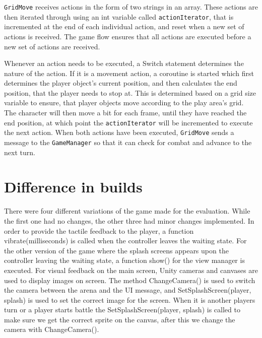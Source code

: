 \texttt{GridMove} receives actions in the form of two strings in an array. These actions are then iterated through using an int variable called \texttt{actionIterator}, that is incremented at the end of each individual action, and reset when a new set of actions is received. The game flow ensures that all actions are executed before a new set of actions are received. 

Whenever an action needs to be executed, a Switch statement determines the nature of the action. If it is a movement action, a coroutine is started which first determines the player object's current position, and then calculates the end position, that the player needs to stop at. This is determined based on a grid size variable to ensure, that player objects move according to the play area's grid. The character will then move a bit for each frame, until they have reached the end position, at which point the \texttt{actionIterator} will be incremented to execute the next action. When both actions have been executed, \texttt{GridMove} sends a message to the \texttt{GameManager} so that it can check for combat and advance to the next turn.

\section{Difference in builds}
There were four different variations of the game made for the evaluation. While the first one had no changes, the other three had minor changes implemented. In order to provide the tactile feedback to the player, a function vibrate(milliseconds) is called when the controller leaves the waiting state. For the other version of the game where the splash screens appears upon the controller leaving the waiting state, a function show() for the view manager is executed. For visual feedback on the main screen, Unity cameras and canvases are used to display images on screen. The method ChangeCamera() is used to switch the camera between the arena and the UI message, and  SetSplashScreen(player, splash) is used to set the correct image for the screen. When it is another players turn or a player starts battle the SetSplashScreen(player, splash) is called to make sure we get the correct sprite on the canvas, after this we change the camera with ChangeCamera(). 

